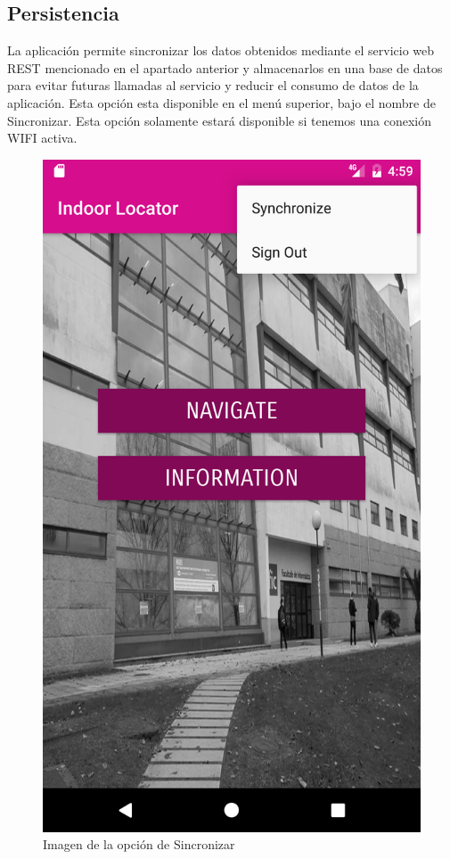 \documentclass[12pt, a4paper, titlepage]{article}
\begin{document}
	\subsection{Persistencia}
	La aplicación permite sincronizar los datos obtenidos mediante el servicio web REST mencionado en el apartado anterior y almacenarlos en una base de datos para evitar futuras llamadas al servicio y reducir el consumo de datos de la aplicación.
	Esta opción esta disponible en el menú superior, bajo el nombre de Sincronizar. Esta opción solamente estará disponible si tenemos una conexión WIFI activa.\\
	
	\begin{figure}[h!]
		\begin{center}
			\includegraphics[scale=0.15]{img/menu_sincronizar.png}
			\caption{Imagen de la opción de Sincronizar}
		\end{center}
	\end{figure}
	
\end{document}
